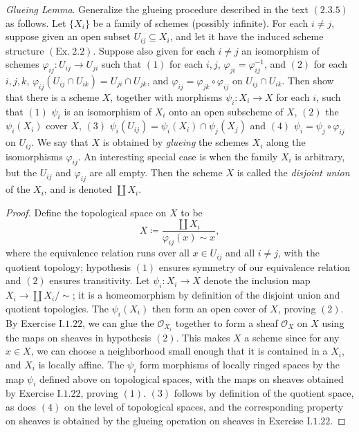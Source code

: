 \documentclass[10pt]{article}
\theoremstyle{definition}
\theoremstyle{remark}
\numberwithin{equation}{section}
\numberwithin{figure}{subsubsection}
\newcommand{\OO}{\mathcal{O}}
\begin{document}
\begin{problem}
  \emph{Glueing Lemma}. Generalize the glueing procedure described in the text $(2.3.5)$ as follows. Let $\{X_i\}$ be a family of schemes (possibly infinite). For each $i \ne j$, suppose given an open subset $U_{ij} \subseteq X_i$, and let it have the induced scheme structure $(\mathrm{Ex}.~2.2)$. Suppose also given for each $i \ne j$ an isomorphism of schemes $\varphi_{ij}\colon U_{ij} \to U_{ji}$ such that $(1)$ for each $i,j$, $\varphi_{ji} = \varphi_{ij}^{-1}$, and $(2)$ for each $i,j,k$, $\varphi_{ij}(U_{ij} \cap U_{ik}) = U_{ji} \cap U_{jk}$, and $\varphi_{ij} = \varphi_{jk} \circ \varphi_{ij}$ on $U_{ij} \cap U_{ik}$. Then show that there is a scheme $X$, together with morphisms $\psi_i\colon X_i \to X$ for each $i$, such that $(1)$ $\psi_i$ is an isomorphism of $X_i$ onto an open subscheme of $X$, $(2)$ the $\psi_i(X_i)$ cover $X$, $(3)$ $\psi_i(U_{ij}) = \psi_i(X_i) \cap \psi_j(X_j)$ and $(4)$ $\psi_i = \psi_j \circ \varphi_{ij}$ on $U_{ij}$. We say that $X$ is obtained by \emph{glueing} the schemes $X_i$ along the isomorphisms $\varphi_{ij}$. An interesting special case is when the family $X_i$ is arbitrary, but the $U_{ij}$ and $\varphi_{ij}$ are all empty. Then the scheme $X$ is called the \emph{disjoint union} of the $X_i$, and is denoted $\coprod X_i$.
\end{problem}
\begin{proof}
  Define the topological space on $X$ to be
  \begin{equation*}
    X \coloneqq \frac{\displaystyle\coprod X_i}{\varphi_{ij}(x) \sim x},
  \end{equation*}
  where the equivalence relation runs over all $x \in U_{ij}$ and all $i \ne j$,
  with the quotient topology; hypothesis $(1)$ ensures symmetry of our
  equivalence relation and $(2)$ ensures transitivity. Let $\psi_i\colon X_i \to
  X$ denote the inclusion map $X_i \to \coprod X_i/\sim$; it is a homeomorphism
  by definition of the disjoint union and quotient topologies. The $\psi_i(X_i)$
  then form an open cover of $X$, proving $(2)$. By Exercise I.$1.22$, we can glue
  the $\OO_{X_i}$ together to form a sheaf $\OO_X$ on $X$ using the maps on
  sheaves in hypothesis $(2)$. This makes $X$ a scheme since for any $x \in X$,
  we can choose a neighborhood small enough that it is contained in a $X_i$, and
  $X_i$ is locally affine. The $\psi_i$ form morphisms of locally ringed spaces
  by the map $\psi_i$ defined above on topological spaces, with the maps on
  sheaves obtained by Exercise I.$1.22$, proving $(1)$. $(3)$ follows by
  definition of the quotient space, as does $(4)$ on the level of topological
  spaces, and the corresponding property on sheaves is obtained by the glueing
  operation on sheaves in Exercise I.$1.22$.
\end{proof}
\end{document}
